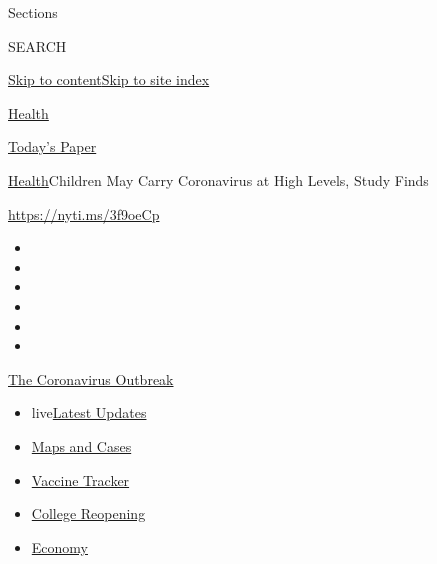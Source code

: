 Sections

SEARCH

\protect\hyperlink{site-content}{Skip to
content}\protect\hyperlink{site-index}{Skip to site index}

\href{https://www.nytimes.com/section/health}{Health}

\href{https://myaccount.nytimes.com/auth/login?response_type=cookie\&client_id=vi}{}

\href{https://www.nytimes.com/section/todayspaper}{Today's Paper}

\href{/section/health}{Health}\textbar{}Children May Carry Coronavirus
at High Levels, Study Finds

\url{https://nyti.ms/3f9oeCp}

\begin{itemize}
\item
\item
\item
\item
\item
\item
\end{itemize}

\href{https://www.nytimes.com/news-event/coronavirus?action=click\&pgtype=Article\&state=default\&region=TOP_BANNER\&context=storylines_menu}{The
Coronavirus Outbreak}

\begin{itemize}
\tightlist
\item
  live\href{https://www.nytimes.com/2020/08/04/world/coronavirus-cases.html?action=click\&pgtype=Article\&state=default\&region=TOP_BANNER\&context=storylines_menu}{Latest
  Updates}
\item
  \href{https://www.nytimes.com/interactive/2020/us/coronavirus-us-cases.html?action=click\&pgtype=Article\&state=default\&region=TOP_BANNER\&context=storylines_menu}{Maps
  and Cases}
\item
  \href{https://www.nytimes.com/interactive/2020/science/coronavirus-vaccine-tracker.html?action=click\&pgtype=Article\&state=default\&region=TOP_BANNER\&context=storylines_menu}{Vaccine
  Tracker}
\item
  \href{https://www.nytimes.com/2020/08/02/us/covid-college-reopening.html?action=click\&pgtype=Article\&state=default\&region=TOP_BANNER\&context=storylines_menu}{College
  Reopening}
\item
  \href{https://www.nytimes.com/live/2020/08/04/business/stock-market-today-coronavirus?action=click\&pgtype=Article\&state=default\&region=TOP_BANNER\&context=storylines_menu}{Economy}
\end{itemize}

